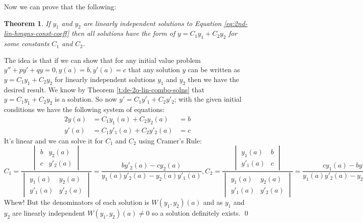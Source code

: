\documentclass[letterpaper, 11pt, openany]{book}
\theoremstyle{mytheoremstyle}
\newtheorem{theorem}{Theorem}[section]
\renewenvironment{proof}{{\par \sffamily \smaller \fontseries{b}\selectfont Proof}}{\hfill\qed}
\theoremstyle{myexamplestyle}
\begin{document}
Now we can prove that the following:
\begin{theorem}
    If \(y_{1}\) and \(y_{2}\) are linearly independent solutions to Equation \eqref{eq:2nd-lin-hmgns-const-coeff} then all solutions have the form of \(y = C_{1} y_{1} + C_{2} y_{2}\) for some constants \(C_{1}\) and \(C_{2}\).
\end{theorem}
\begin{proof}
    The idea is that if we can show that for any initial value problem \(y'' + py' + qy = 0, y(a) = b, y'(a) = c\) that any solution \(y\) can be written as \(y = C_{1} y_{1} + C_{2} y_{2}\) for linearly independent solutions \(y_{1}\) and \(y_{2}\) then we have the desired result. We know by Theorem \ref{t:de-2o-lin-combo-solns} that \(y = C_{1} y_{1} + C_{2} y_{2}\) is a solution. So now \(y' = C_{1} y'_{1} + C_{2} y'_{2}\); with the given initial conditions we have the following system of equations:
    \begin{alignat*}{2}
        y(a) &= C_{1} y_{1}(a) + C_{2} y_{2}(a) &= b\\
        y'(a) &= C_{1} y'_{1}(a) + C_{2} y'_{2}(a) &= c
    \end{alignat*}
    It's linear and we can solve it for \(C_{1}\) and \(C_{2}\) using Cramer's Rule:
    \[
        C_{1} = \frac{  \begin{vmatrix}
                        b & y_{2}(a)\\
                        c & y'_{2}(a)
                    \end{vmatrix}
                }
                {\begin{vmatrix}
                    y_{1}(a)  & y_{2}(a)\\
                    y'_{1}(a) & y'_{2}(a)
                \end{vmatrix}} = \frac{b y'_{2}(a) - c y_{2}(a)}{y_{1}(a)y'_{2}(a) - y_{2}(a)y'_{1}(a)}
    , C_{2} = \frac{    \begin{vmatrix}
                            y_{1}(a)  & b\\
                            y'_{1}(a) & c
                        \end{vmatrix}}
{\begin{vmatrix}
    y_{1}(a)  & y_{2}(a)\\
    y'_{1}(a) & y'_{2}(a)
\end{vmatrix}} = \frac{c y_{1}(a) - b y'_{1}(a)}{y_{1}(a)y'_{2}(a) - y_{2}(a)y'_{1}(a)}
\]
Whew! But the denominators of each solution is \(W(y_{1}, y_{2})(a)\) and as \(y_{1}\) and \(y_{2}\) are linearly independent \(W(y_{1}, y_{2})(a) \neq 0\) so a solution definitely exists.
\end{proof}
\end{document}
